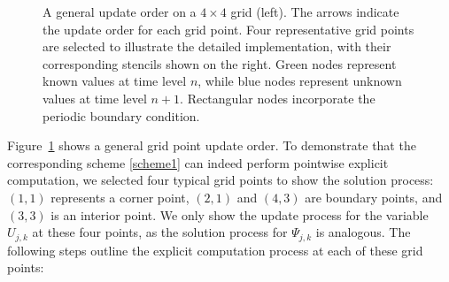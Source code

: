 \documentclass[fleqn,11pt]{elsarticle}
\numberwithin{equation}{section}
\begin{document}
\begin{figure}[H]
\begin{minipage}{0.5\textwidth}
\begin{minipage}{0.45\textwidth}
		\end{minipage}

	\end{minipage}


	\caption{A general update order on a $4 \times 4$ grid (left). The arrows indicate the update order for each grid point. Four representative grid points are selected to illustrate the detailed implementation, with their corresponding stencils shown on the right. Green nodes represent known values at time level $n$, while blue nodes represent unknown values at time level $n+1$. Rectangular nodes incorporate the periodic boundary condition.}
	\label{fig:ex}
\end{figure}

Figure~\ref{fig:ex} shows a general grid point update order. To demonstrate that the corresponding scheme \eqref{scheme1} can indeed perform pointwise explicit computation, we selected four typical grid points to show the solution process: $(1,1)$ represents a corner point, $(2,1)$ and $(4,3)$ are boundary points, and $(3,3)$ is an interior point. We only show the update process for the variable $U_{j,k}$ at these four points, as the solution process for $\Psi_{j,k}$ is analogous. The following steps outline the explicit computation process at each of these grid points:
\end{document}
